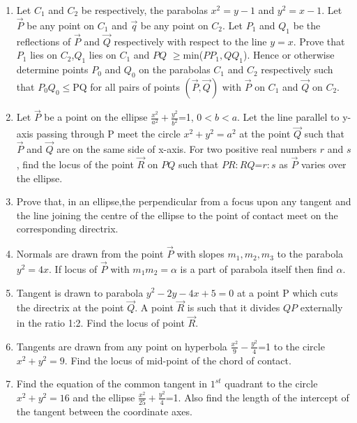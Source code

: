 \documentclass[journal]{IEEEtran}
\numberwithin{equation}{enumi}
\numberwithin{figure}{enumi}
\begin{document}
\begin{enumerate}
\hfill{}
\item Let $C_1$ and $C_2$ be respectively, the parabolas $x^2=y-1$ and $y^2=x-1$. Let $\Vec{P}$ be any point on $C_1$ and $\vec{q}$ be any point on $C_2$. Let $P_1$ and $Q_1$ be the reflections of $\Vec{P}$ and $\Vec{Q}$ respectively with respect to the line $y=x$. Prove that $P_1$ lies on $C_2$,$Q_1$ lies on $C_1$ and $PQ$ $\geq$min({$PP_1,QQ_1$}). Hence or otherwise determine points $P_0$ and $Q_0$ on the parabolas $C_1$ and $C_2$ respectively such that $P_0Q_0$$\leq$PQ for all pairs of points $(\Vec{P},\Vec{Q})$ with $\vec{P}$ on $C_1$ and $\vec{Q}$ on $C_2$.
\hfill{}
\item Let $\Vec{P}$ be a point on the ellipse $\frac{x^2}{a^2}+\frac{y^2}{b^2}$=1, $0<b<a$. Let the line parallel to y-axis passing through P meet the circle $x^2+y^2=a^2$ at the point $\Vec{Q}$ such that $\Vec{P}$ and $\Vec{Q}$ are on the same side of x-axis. For two positive real numbers $r$ and $s$, find the locus of the point $\Vec{R}$ on $PQ$ such that $PR:RQ$=$r:s$ as $\Vec{P}$ varies over the ellipse.
\hfill{}
\item Prove that, in an ellipse,the perpendicular from a focus upon any tangent and the line joining the centre of the ellipse to the point of contact meet on the  corresponding directrix.
\\\hfill{}
\item Normals are drawn from the point $\Vec{P}$ with slopes $m_1,m_2,m_3$ to the parabola $y^2=4x$. If locus of $\Vec{P}$ with $m_1m_2=\alpha$ is a part of parabola itself then find $\alpha$.
\hfill{}  
\item Tangent is drawn to parabola $y^2-2y-4x+5=0$ at a point P which cuts the directrix at the point $\Vec{Q}$. A point $\Vec{R}$ is such that it divides $QP$ externally in the ratio 1:2. Find the locus of point $\Vec{R}$.
\hfill{}
\item Tangents are drawn from any point on hyperbola $\frac{x^2}{9}-\frac{y^2}{4}$=1 to the circle $x^2+y^2=9$. Find the locus of mid-point of the chord of contact.
 \hfill{}
\item Find the equation of the common tangent in $1^{st}$ quadrant to the circle $x^2+y^2=16$ and the ellipse $\frac{x^2}{25}+\frac{y^2}{4}$=1. Also find the length of the intercept of the tangent between the coordinate axes.
\hfill{}
\end{enumerate}
\end{document}

